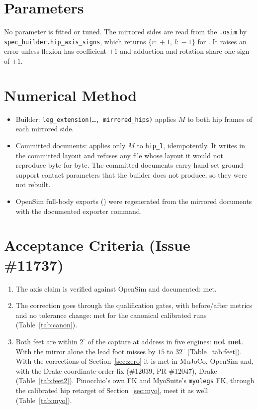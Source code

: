 \documentclass[11pt]{article}
\begin{document}
\section{Parameters}

No parameter is fitted or tuned. The mirrored sides are read from the
\texttt{.osim} by \texttt{spec\_builder.hip\_axis\_signs}, which returns
$\{r\!:\!+1,\ l\!:\!-1\}$ for . It raises an error
unless flexion has coefficient $+1$ and adduction and rotation share one sign
of $\pm1$.

\section{Numerical Method}

\begin{itemize}
  \item Builder: \texttt{leg\_extension(\ldots, mirrored\_hips)} applies
    $M$ to both hip frames of each mirrored side.
  \item Committed documents:  applies
    only $M$ to \texttt{hip\_l}, idempotently. It writes in the committed
    layout and refuses any file whose layout it would not reproduce byte for
    byte. The committed documents carry hand-set ground-support contact
    parameters that the builder does not produce, so they were not rebuilt.
  \item OpenSim full-body exports ()
    were regenerated from the mirrored documents with the documented exporter
    command.
\end{itemize}

\section{Acceptance Criteria (Issue \#11737)}

\begin{enumerate}
  \item The axis claim is verified against OpenSim and documented: met.
  \item The correction goes through the qualification gates, with
    before/after metrics and no tolerance change: met for the canonical
    calibrated runs (Table~\ref{tab:canon}).
  \item Both feet are within $2^\circ$ of the capture at address in five
    engines: \textbf{not met}. With the mirror alone the lead foot misses
    by $15$ to $32^\circ$ (Table~\ref{tab:feet}). With the corrections of
    Section~\ref{sec:zero} it is met in MuJoCo, OpenSim and, with the Drake
    coordinate-order fix (\#12039, PR \#12047), Drake (Table~\ref{tab:feet2}).
    Pinocchio's own FK and MyoSuite's \texttt{myolegs} FK, through the
    calibrated hip retarget of Section~\ref{sec:myo}, meet it as well
    (Table~\ref{tab:myo}).
\end{enumerate}
\end{document}
